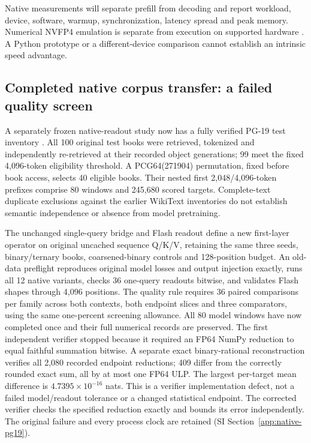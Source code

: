 \documentclass[11pt]{article}
\begin{document}
Native measurements will separate prefill from decoding and report workload,
device, software, warmup, synchronization, latency spread and peak memory.
Numerical NVFP4 emulation is separate from execution on supported hardware
\citep{nvidia2026nvfp4}. A Python prototype or a different-device comparison
cannot establish an intrinsic speed advantage.

\subsection{Completed native corpus transfer: a failed quality screen}
\label{sec:native-pg19}

A separately frozen native-readout study now has a fully verified PG-19
test inventory \citep{pg19data}. All 100 original test books were retrieved,
tokenized and independently re-retrieved at their recorded object generations;
99 meet the fixed 4,096-token eligibility threshold. A PCG64(271904)
permutation, fixed before book access, selects 40 eligible books. Their nested
first 2,048/4,096-token prefixes comprise 80 windows and 245,680 scored
targets. Complete-text duplicate exclusions against the earlier WikiText
inventories do not establish semantic independence or absence from model
pretraining.

The unchanged single-query bridge and Flash readout define a new first-layer
operator on original uncached sequence Q/K/V, retaining the same three seeds,
binary/ternary books, coarsened-binary controls and 128-position budget. An
old-data preflight reproduces original model losses and output injection
exactly, runs all 12 native variants, checks 36 one-query readouts bitwise,
and validates Flash shapes through 4,096 positions. The quality rule requires
36 paired comparisons per family across both contexts, both endpoint slices
and three comparators, using the same one-percent screening allowance.
All 80 model windows have now completed once and their full numerical records
are preserved. The first independent verifier stopped because it required
an FP64 NumPy reduction to equal faithful summation bitwise. A separate exact
binary-rational reconstruction verifies all 2,080 recorded endpoint reductions;
409 differ from the correctly rounded exact sum, all by at most one FP64 ULP.
The largest per-target mean difference is
\(4.7395\times10^{-16}\) nats. This is a verifier implementation defect,
not a failed model/readout tolerance or a changed statistical endpoint.
The corrected verifier checks the specified reduction exactly and bounds its
error independently. The original failure and every process clock are retained
(SI Section~\ref{app:native-pg19}).
\end{document}
